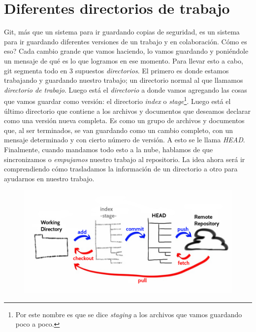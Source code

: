 \documentclass[10pt,letterpaper]{article}
\begin{document}
\section{Diferentes directorios de trabajo}
Git, m\'as que un sistema para ir guardando copias de seguridad, es un sistema para ir guardando diferentes versiones de un trabajo y en colaboraci\'on. C\'omo es eso? Cada cambio grande que vamos haciendo, lo vamos guardando y poni\'endole un mensaje de qu\'e es lo que logramos en ese momento. Para llevar esto a cabo, git segmenta todo en 3 supuestos \textit{directorios}. El primero es donde estamos trabajando y guardando nuestro trabajo; un directorio normal al que llamamos \emph{directorio de trabajo}. Luego est\'a el \textit{directorio} a donde vamos agregando las cosas que vamos guardar como versi\'on: el directorio \emph{index} o \emph{stage}\footnote{Por este nombre es que se dice \emph{staging} a los archivos que vamos guardando poco a poco.}. Luego est\'a el \'ultimo directorio que contiene a los archivos y documentos que deseamos declarar como una versi\'on nueva completa. Es como un grupo de archivos y documentos que, al ser terminados, se van guardando como un cambio completo, con un mensaje determinado y con cierto n\'umero de versi\'on. A esto se le llama \emph{HEAD}. Finalmente, cuando mandamos todo esto a la nube, hablamos de que sincronizamos o \emph{empujamos} nuestro trabajo al repositorio. La idea ahora ser\'a ir comprendiendo c\'omo trasladamos la informaci\'on de un directorio a otro para ayudarnos en nuestro trabajo.

\begin{figure}[H]
\begin{center}
\includegraphics[scale=0.4]{img/git_diagram.jpg} 
\end{center}
\end{figure}
\end{document}
